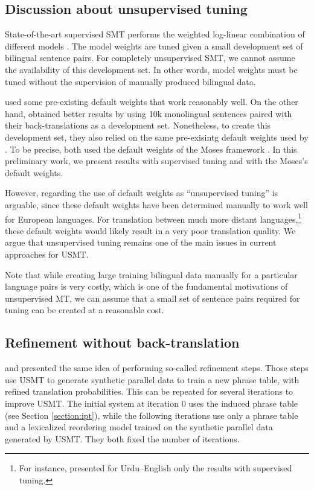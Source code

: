 \documentclass[11pt,a4paper]{article}
\newcommand{\moses}{Moses}
\begin{document}
\subsection{Discussion about unsupervised tuning}
\label{section:tuning}
State-of-the-art supervised SMT performs the weighted log-linear combination of different models \citep{och-ney:2002:ACL}. The model weights are tuned given a small development set of bilingual sentence pairs. 
For completely unsupervised SMT, we cannot assume the availability of this development set. In other words, model weights must be tuned without the supervision of manually produced bilingual data.

\citet{DBLP:journals/corr/abs-1804-07755} used some pre-existing default weights that work reasonably well. On the other hand, \citet{artetxe2018unsupervised} obtained better results by using 10k monolingual sentences paired with their back-translations as a development set. Nonetheless, to create this development set, they also relied on the same pre-exisintg default weights used by \citet{DBLP:journals/corr/abs-1804-07755}. To be precise, both used the default weights of the {\moses} framework \citep{P07-2045}.
In this preliminary work, we present results with supervised tuning and with the {\moses}'s default weights.

However, regarding the use of default weights as ``unsupervised tuning'' is arguable, since these default weights have been determined manually to work well for European languages. For translation between much more distant languages,\footnote{For instance, \citet{DBLP:journals/corr/abs-1804-07755} presented for Urdu--English only the results with supervised tuning.} these default weights would likely result in a very poor translation quality. We argue that unsupervised tuning remains one of the main issues in current approaches for USMT. 

Note that while creating large training bilingual data manually for a particular language pairs is very costly, which is one of the fundamental motivations of unsupervised MT, we can assume that a small set of sentence pairs required for tuning can be created at a reasonable cost.


\subsection{Refinement without back-translation}
\label{section:refinement}
\citet{artetxe2018unsupervised} and \citet{DBLP:journals/corr/abs-1804-07755} presented the same idea of performing so-called refinement steps. Those steps use USMT to generate synthetic parallel data to train a new phrase table, with refined translation probabilities. This can be repeated for several iterations to improve USMT. The initial system at iteration 0 uses the induced phrase table (see Section \ref{section:ipt}), while the following iterations use only a phrase table and a lexicalized reordering model trained on the synthetic parallel data generated by USMT. They both fixed the number of iterations.
\end{document}
